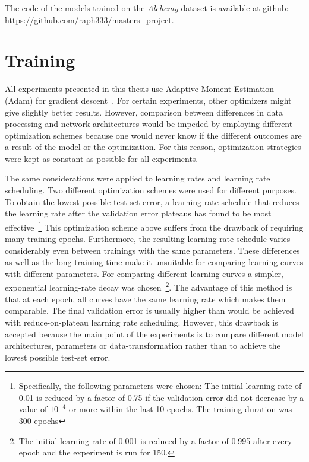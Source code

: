 The code of the models trained on the \textit{Alchemy} dataset is available at github: \url{https://github.com/raph333/masters\_project}.



\section{Training}
\label{sec:training}

All experiments presented in this thesis use Adaptive Moment Estimation (Adam) for gradient descent~\cite{Kingma2015}. For certain experiments, other optimizers might give slightly better results. However, comparison between differences in data processing and network architectures would be impeded by employing different optimization schemes because one would never know if the different outcomes are a result of the model or the optimization. For this reason, optimization strategies were kept as constant as possible for all experiments.

The same considerations were applied to learning rates and learning rate scheduling. Two different optimization schemes were used for different purposes.
To obtain the lowest possible test-set error, a learning rate schedule that reduces the learning rate after the validation error plateaus has found to be most effective~\footnote{Specifically, the following parameters were chosen: The initial learning rate of 0.01 is reduced by a factor of 0.75 if the validation error did not decrease by a value of $10^{-4}$ or more within the last 10 epochs. The training duration was 300 epochs} This optimization scheme above suffers from the drawback of requiring many training epochs. Furthermore, the resulting learning-rate schedule varies considerably even between trainings with the same parameters. These differences as well as the long training time make it unsuitable for comparing learning curves with different parameters.
For comparing different learning curves a simpler, exponential learning-rate decay was chosen~\footnote{The initial learning rate of 0.001 is reduced by a factor of 0.995 after every epoch and the experiment is run for 150.}. The advantage of this method is that at each epoch, all curves have the same learning rate which makes them comparable. The final validation error is usually higher than would be achieved with reduce-on-plateau learning rate scheduling. However, this drawback is accepted because the main point of the experiments is to compare different model architectures, parameters or data-transformation rather than to achieve the lowest possible test-set error.

